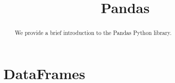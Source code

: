 \documentclass{ximera}
\title{Pandas}
\begin{document}
\begin{abstract}
	We provide a brief introduction to the Pandas Python library.
\end{abstract}
\maketitle

\section{DataFrames}
\end{document}
